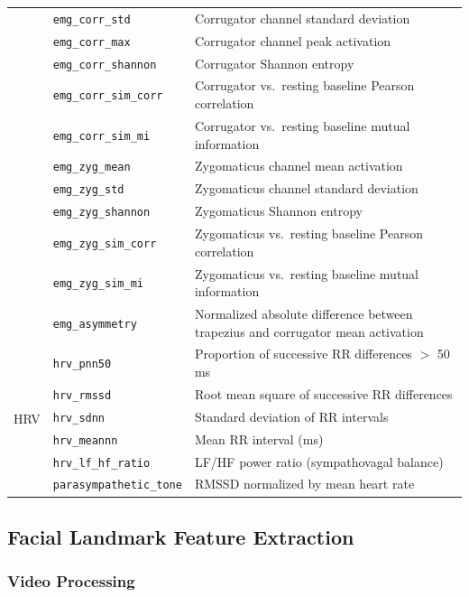 \documentclass[10pt, twocolumn]{article}
\begin{document}
\begin{table}[tbp]
\begin{tabular}{llp{7.8cm}}
  & \texttt{emg\_corr\_std}        & Corrugator channel standard deviation \\
  & \texttt{emg\_corr\_max}        & Corrugator channel peak activation \\
  & \texttt{emg\_corr\_shannon}    & Corrugator Shannon entropy \\
  & \texttt{emg\_corr\_sim\_corr}  & Corrugator vs.\ resting baseline Pearson correlation \\
  & \texttt{emg\_corr\_sim\_mi}    & Corrugator vs.\ resting baseline mutual information \\
  & \texttt{emg\_zyg\_mean}        & Zygomaticus channel mean activation \\
  & \texttt{emg\_zyg\_std}         & Zygomaticus channel standard deviation \\
  & \texttt{emg\_zyg\_shannon}     & Zygomaticus Shannon entropy \\
  & \texttt{emg\_zyg\_sim\_corr}   & Zygomaticus vs.\ resting baseline Pearson correlation \\
  & \texttt{emg\_zyg\_sim\_mi}     & Zygomaticus vs.\ resting baseline mutual information \\
  & \texttt{emg\_asymmetry}        & Normalized absolute difference between trapezius and corrugator mean activation \\
\midrule
\multirow{6}{*}{HRV}
  & \texttt{hrv\_pnn50}            & Proportion of successive RR differences $>$ 50\,ms \\
  & \texttt{hrv\_rmssd}            & Root mean square of successive RR differences \\
  & \texttt{hrv\_sdnn}             & Standard deviation of RR intervals \\
  & \texttt{hrv\_meannn}           & Mean RR interval (ms) \\
  & \texttt{hrv\_lf\_hf\_ratio}    & LF/HF power ratio (sympathovagal balance) \\
  & \texttt{parasympathetic\_tone} & RMSSD normalized by mean heart rate \\
\bottomrule
\end{tabular}
\end{table}

\subsection{Facial Landmark Feature Extraction}

\subsubsection{Video Processing}
\end{document}
